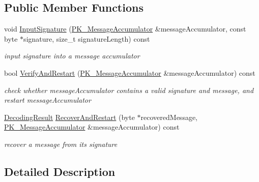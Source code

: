 \subsection*{Public Member Functions}
\begin{DoxyCompactItemize}
\item 
\hypertarget{class_d_l___verifier_base_a488eb7c192589ca5407e5099bda82166}{
void \hyperlink{class_d_l___verifier_base_a488eb7c192589ca5407e5099bda82166}{InputSignature} (\hyperlink{class_p_k___message_accumulator}{PK\_\-MessageAccumulator} \&messageAccumulator, const byte $\ast$signature, size\_\-t signatureLength) const }
\label{class_d_l___verifier_base_a488eb7c192589ca5407e5099bda82166}

\begin{DoxyCompactList}\small\item\em input signature into a message accumulator \item\end{DoxyCompactList}\item 
\hypertarget{class_d_l___verifier_base_ad0b34892f6f185987d6662a3b842df97}{
bool \hyperlink{class_d_l___verifier_base_ad0b34892f6f185987d6662a3b842df97}{VerifyAndRestart} (\hyperlink{class_p_k___message_accumulator}{PK\_\-MessageAccumulator} \&messageAccumulator) const }
\label{class_d_l___verifier_base_ad0b34892f6f185987d6662a3b842df97}

\begin{DoxyCompactList}\small\item\em check whether messageAccumulator contains a valid signature and message, and restart messageAccumulator \item\end{DoxyCompactList}\item 
\hyperlink{struct_decoding_result}{DecodingResult} \hyperlink{class_d_l___verifier_base_ab37d4d41fcc169d71b5b3a9d1e508270}{RecoverAndRestart} (byte $\ast$recoveredMessage, \hyperlink{class_p_k___message_accumulator}{PK\_\-MessageAccumulator} \&messageAccumulator) const 
\begin{DoxyCompactList}\small\item\em recover a message from its signature \item\end{DoxyCompactList}\end{DoxyCompactItemize}


\subsection{Detailed Description}
